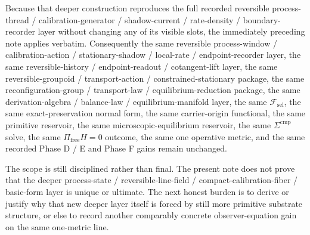 \documentclass[11pt]{article}
\newcommand{\StemFunctional}{\mathscr F_{\mathrm{sel}}}
\begin{document}
Because that deeper construction reproduces the full recorded reversible process-thread / calibration-generator / shadow-current / rate-density / boundary-recorder layer without changing any of its visible slots, the immediately preceding note applies verbatim. Consequently the same reversible process-window / calibration-action / stationary-shadow / local-rate / endpoint-recorder layer, the same reversible-history / endpoint-readout / cotangent-lift layer, the same reversible-groupoid / transport-action / constrained-stationary package, the same reconfiguration-group / transport-law / equilibrium-reduction package, the same derivation-algebra / balance-law / equilibrium-manifold layer, the same \(\StemFunctional\), the same exact-preservation normal form, the same carrier-origin functional, the same primitive reservoir, the same microscopic-equilibrium reservoir, the same \(\Sigma^{\mathrm{cmp}}\) solve, the same \(\Pi_{\mathrm{free}}H=0\) outcome, the same one operative metric, and the same recorded Phase D / E and Phase F gains remain unchanged.

The scope is still disciplined rather than final. The present note does not prove that the deeper process-state / reversible-line-field / compact-calibration-fiber / basic-form layer is unique or ultimate. The next honest burden is to derive or justify why that new deeper layer itself is forced by still more primitive substrate structure, or else to record another comparably concrete observer-equation gain on the same one-metric line.
\end{document}
